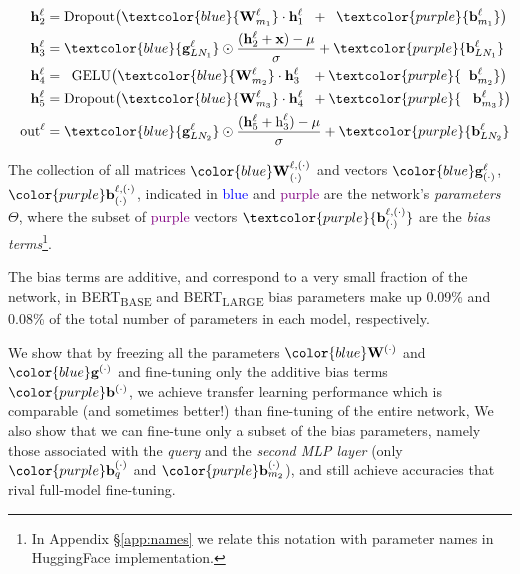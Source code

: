 \begin{align}
\mathbf{h}_{2}^{\ell} &= \text{Dropout}\big{(} \textcolor{blue}{\mathbf{W}_{m_1}^{\ell}} \cdot \mathbf{h}_{1}^{\ell}\;\;+\;\;\textcolor{purple}{\mathbf{b}_{m_1}^{\ell}} \big{)}\\
\mathbf{h}_{3}^{\ell} &= \textcolor{blue}{\mathbf{g}_{LN_1}^{\ell}}\odot\frac{(\mathbf{h}_{2}^{\ell} + \mathbf{x}) - \mu}{\sigma} + \textcolor{purple}{\mathbf{b}_{LN_1}^{\ell}}\\
\mathbf{h}_{4}^{\ell} &= \;\;\text{GELU}\big{(}\textcolor{blue}{\mathbf{W}_{m_2}^{\ell}} \cdot \mathbf{h}_{3}^{\ell} \;\;\;+\textcolor{purple}{\;\;\mathbf{b}_{m_2}^{\ell}}\big{)}\\
\mathbf{h}_{5}^{\ell} &= \text{Dropout}\big{(}\textcolor{blue}{\mathbf{W}_{m_3}^{\ell}} \cdot \mathbf{h}_{4}^{\ell}\;\;+\textcolor{purple}{\;\;\;\mathbf{b}_{m_3}^{\ell}}\big{)}\\
\mathbf{\;\;\;\text{out}}^{\ell} &= \textcolor{blue}{\mathbf{g}_{LN_2}^{\ell}}\odot\frac{(\mathbf{h}_{5}^{\ell} + \text{h}_{3}^{\ell}) - \mu}{\sigma} + \textcolor{purple}{\mathbf{b}_{LN_2}^{\ell}}
\end{align}

The collection of all matrices $\color{blue}\mathbf{W}_{(\cdot)}^{\ell, (\cdot)}$ and vectors $\color{blue}\mathbf{g}_{(\cdot)}^{\ell}$, $\color{purple}\mathbf{b}_{(\cdot)}^{\ell, (\cdot)}$, indicated in  \textcolor{blue}{blue} and \textcolor{purple}{purple} are the network's \emph{parameters} $\Theta$, where the subset of \textcolor{purple}{purple} vectors $\textcolor{purple}{\mathbf{b}_{(\cdot)}^{\ell, (\cdot)}}$ are the \emph{bias terms}\footnote{In Appendix \S\ref{app:names} we relate this notation with parameter names in HuggingFace implementation.}.

The bias terms are additive, and correspond to a very small fraction of the network, in BERT\textsubscript{BASE} and BERT\textsubscript{LARGE} bias parameters make up 0.09\% and 0.08\% of the total number of parameters in each model, respectively.

We show that by freezing all the parameters $\color{blue}\mathbf{W}^{(\cdot)}$ and $\color{blue}\mathbf{g}^{(\cdot)}$ and fine-tuning only the additive bias terms $\color{purple}\mathbf{b}^{(\cdot)}$, we achieve transfer learning performance which is comparable (and sometimes better!) than fine-tuning of the entire network, We also show that we can fine-tune only a subset of the bias parameters, namely those associated with the \emph{query} and the \emph{second MLP layer}  (only $\color{purple}\mathbf{b}_{q}^{(\cdot)}$ and $\color{purple}\mathbf{b}_{m_2}^{(\cdot)}$), and still achieve accuracies that rival full-model fine-tuning. 

